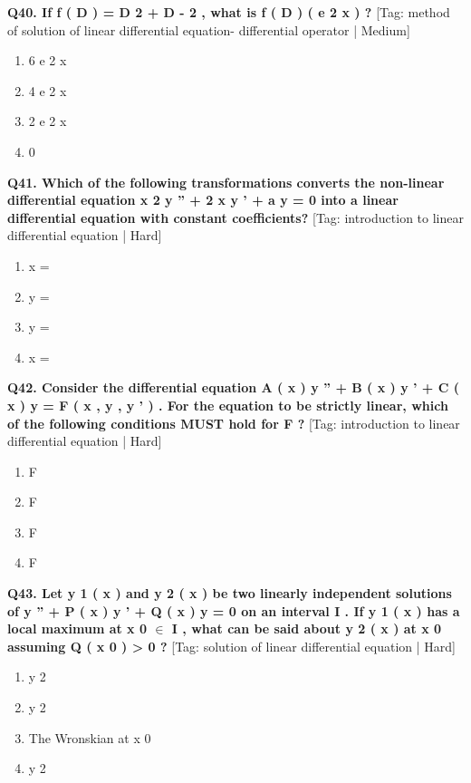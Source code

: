 \noindent\textbf{Q40. If f ( D ) = D 2 + D - 2 , what is f ( D ) ( e 2 x ) ?} \hfill [Tag: method of solution of linear differential equation- differential operator | Medium]
\begin{enumerate}[label=(\alph*),topsep=2pt,itemsep=1pt,partopsep=0pt,parsep=0pt]
    \item {{6 e 2 x}}
    \item {{4 e 2 x}}
    \item {{2 e 2 x}}
    \item {{0}}
\end{enumerate}
\vspace{2mm}

\noindent\textbf{Q41. Which of the following transformations converts the non-linear differential equation x 2 y '' + 2 x y ' + a y = 0 into a linear differential equation with constant coefficients?} \hfill [Tag: introduction to linear differential equation | Hard]
\begin{enumerate}[label=(\alph*),topsep=2pt,itemsep=1pt,partopsep=0pt,parsep=0pt]
    \item {{x =}}
    \item {{y =}}
    \item {{y =}}
    \item {{x =}}
\end{enumerate}
\vspace{2mm}

\noindent\textbf{Q42. Consider the differential equation A ( x ) y '' + B ( x ) y ' + C ( x ) y = F ( x , y , y ' ) . For the equation to be strictly linear, which of the following conditions MUST hold for F ?} \hfill [Tag: introduction to linear differential equation | Hard]
\begin{enumerate}[label=(\alph*),topsep=2pt,itemsep=1pt,partopsep=0pt,parsep=0pt]
    \item {{F}}
    \item {{F}}
    \item {{F}}
    \item {{F}}
\end{enumerate}
\vspace{2mm}

\noindent\textbf{Q43. Let y 1 ( x ) and y 2 ( x ) be two linearly independent solutions of y '' + P ( x ) y ' + Q ( x ) y = 0 on an interval I . If y 1 ( x ) has a local maximum at x 0 $\in$ I , what can be said about y 2 ( x ) at x 0 assuming Q ( x 0 ) > 0 ?} \hfill [Tag: solution of linear differential equation | Hard]
\begin{enumerate}[label=(\alph*),topsep=2pt,itemsep=1pt,partopsep=0pt,parsep=0pt]
    \item {{y 2}}
    \item {{y 2}}
    \item {{The Wronskian at x 0}}
    \item {{y 2}}
\end{enumerate}
\vspace{2mm}

